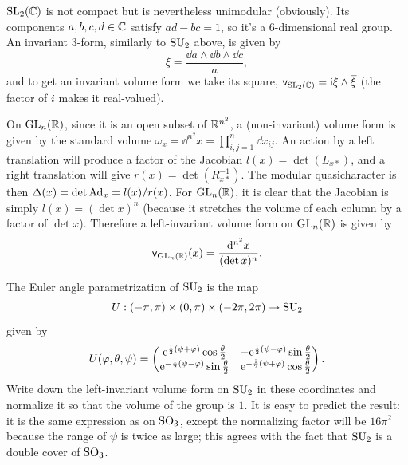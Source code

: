 \begin{example}
    $\operatorname{SL}_2(\mathbb{C})$ is not compact but is nevertheless unimodular (obviously). Its components $a,b,c,d\in\mathbb{C}$ satisfy $ad-bc=1$, so it's a 6-dimensional real group. An invariant 3-form, similarly to $\operatorname{SU}_2$ above, is given by
    \[\xi=\frac{\dd a\wedge\dd b\wedge \dd c}{a},\]
    and to get an invariant volume form we take its square, $\mathsf{v}_{\SL_2(\bbC)}=\rmi\xi\wedge\wb{\xi}$ (the factor of $i$ makes it real-valued).
\end{example}

\begin{example}
    On $\operatorname{GL}_n(\mathbb{R})$, since it is an open subset of $\mathbb{R}^{n^2}$, a (non-invariant) volume form is given by the standard volume $\omega_x=\dd^{n^2} x=\prod_{i,j=1}^n\dd x_{ij}$. An action by a left translation will produce a factor of the Jacobian $l(x)=\det(L_{x\ast})$, and a right translation will give $r(x)=\det(R_{x\ast }^{-1})$. The modular quasicharacter is then $\Delta(x)=\det\mathrm{Ad}_x=l(x)/r(x)$. For $\operatorname{GL}_n(\mathbb{R})$, it is clear that the Jacobian is simply $l(x)=(\det x)^n$ (because it stretches the volume of each column by a factor of $\det x$). Therefore a left-invariant volume form on $\operatorname{GL}_n(\mathbb{R})$ is given by
    \[\mathsf{v}_{\operatorname{GL}_n(\mathbb{R})}(x)=\frac{{\mathrm{d}}^{n^2} x}{(\det x)^n}.\]
\end{example}


\begin{xca}
    The Euler angle parametrization of $\operatorname{SU}_2$ is the map
    \[U:(-\pi,\pi)\times(0,\pi)\times(-2\pi,2\pi)\to \operatorname{SU}_2\]
    given by
    \[U(\varphi,\theta,\psi)=
    \begin{pmatrix}
        \mathrm{e}^{\frac {\mathrm{i}} 2(\psi+\varphi)}\cos\frac{\theta}{2} &  -\mathrm{e}^{\frac {\mathrm{i}} 2(\psi-\varphi)}\sin\frac{\theta}{2}\\
         \mathrm{e}^{-\frac {\mathrm{i}} 2(\psi-\varphi)}\sin\frac{\theta}{2} &  \mathrm{e}^{-\frac {\mathrm{i}} 2(\psi+\varphi)}\cos\frac{\theta}{2}
    \end{pmatrix}.\]
    Write down the left-invariant volume form on $\operatorname{SU}_2$ in these coordinates and normalize it so that the volume of the group is $1$. It is easy to predict the result: it is the same expression as on $\operatorname{SO}_3$, except the normalizing factor will be $16\pi^2$ because the range of $\psi$ is twice as large; this agrees with the fact that $\operatorname{SU}_2$ is a double cover of $\operatorname{SO}_3$.
\end{xca}







